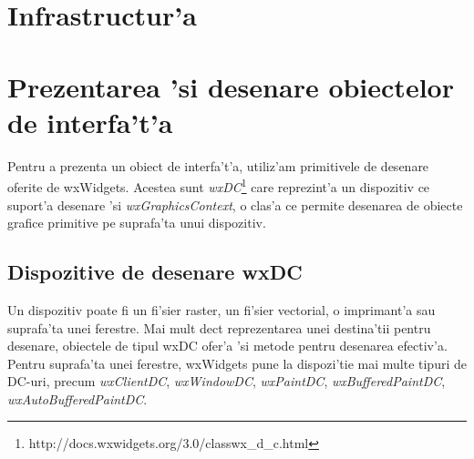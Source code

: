 
\section{Infrastructur'a}


\section{Prezentarea 'si desenare obiectelor de interfa't'a}

Pentru a prezenta un obiect de interfa't'a, utiliz'am primitivele de desenare oferite de wxWidgets. Acestea sunt \emph{wxDC}\footnote{http://docs.wxwidgets.org/3.0/classwx\_d\_c.html} care reprezint'a un dispozitiv ce suport'a desenare 'si \emph{wxGraphicsContext}, o clas'a ce permite desenarea de obiecte grafice primitive pe suprafa'ta unui dispozitiv. 

\subsection{Dispozitive de desenare wxDC}

Un dispozitiv poate fi un fi'sier raster, un fi'sier vectorial, o imprimant'a sau suprafa'ta unei ferestre. Mai mult dec{\ia}t reprezentarea unei destina'tii pentru desenare, obiectele de tipul wxDC ofer'a 'si metode pentru desenarea efectiv'a. Pentru suprafa'ta unei ferestre, wxWidgets pune la dispozi'tie mai multe tipuri de DC-uri, precum \emph{wxClientDC}, \emph{wxWindowDC}, \emph{wxPaintDC}, \emph{wxBufferedPaintDC}, \emph{wxAutoBufferedPaintDC}.

